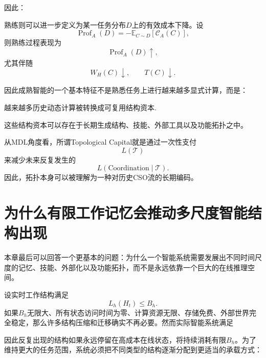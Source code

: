 因此：
\begin{statementbox}
\centering
{}
\end{statementbox}

熟练则可以进一步定义为某一任务分布$D$上的有效成本下降。设
\[
\operatorname{Prof}_A(D)
=
-
\mathbb E_{C\sim D}
[
\mathscr C_A(C)
],
\]
则熟练过程表现为
\[
\operatorname{Prof}_A(D)\uparrow,
\]
尤其伴随
\[
W_H(C)\downarrow,
\qquad
T(C)\downarrow.
\]

因此成熟智能的一个基本特征不是熟悉任务上进行越来越多显式计算，而是：
\begin{statementbox}
越来越多历史动态计算被转换成可复用结构资本.
\end{statementbox}

这些结构资本可以存在于长期生成结构、技能、外部工具以及功能拓扑之中。

从MDL角度看，所谓Topological Capital就是通过一次性支付
\[
L(\mathcal T)
\]
来减少未来反复发生的
\[
L(\mathrm{Coordination}\mid\mathcal T).
\]
因此，拓扑本身可以被理解为一种对历史CSO流的长期编码。

\section{为什么有限工作记忆会推动多尺度智能结构出现}

本章最后可以回答一个更基本的问题：为什么一个智能系统需要发展出不同时间尺度的记忆、技能、外部化以及功能拓扑，而不是永远依靠一个巨大的在线推理空间。

设实时工作结构满足
\[
L_h(H_t)\leq B_h.
\]
如果$B_h$无限大、所有状态访问时间为零、计算资源无限、存储免费、外部世界完全稳定，那么许多结构压缩和迁移确实不再必要。然而实际智能系统满足
\begin{statementbox}
\centering
{}
\end{statementbox}

因此反复出现的结构如果永远停留在高成本在线状态，将持续消耗有限$B_h$。为了维持更大的任务范围，系统必须把不同类型的结构逐渐分配到更适当的承载方式：

\begin{statementbox}
\centering
{}
\end{statementbox}

